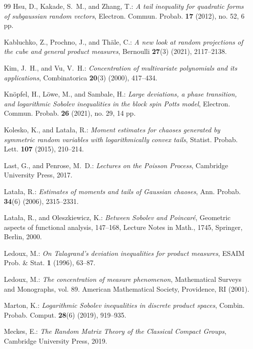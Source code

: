 \documentclass[a4paper,12pt]{amsart}
\numberwithin{equation}{section}
\theoremstyle{remark}
\begin{document}
\begin{thebibliography}{99}
	 Hsu, D., Kakade, S.\, M., and Zhang, T.: \emph{A tail inequality for quadratic forms of subgaussian random vectors}, Electron. Commun. Probab. \textbf{17} (2012), no. 52, 6 pp.
	
	 Kabluchko, Z., Prochno, J., and Th\"{a}le, C.: \emph{A new look at random projections of the cube and general product measures}, Bernoulli \textbf{27}(3) (2021), 2117--2138.
	
	 Kim, J.\, H., and Vu, V.\, H.: \emph{Concentration of multivariate polynomials and its applications}, Combinatorica \textbf{20}(3) (2000), 417--434.
	
	 Kn\"{o}pfel, H., L\"{o}we, M., and Sambale, H.: \emph{Large deviations, a phase transition, and logarithmic Sobolev inequalities in the block spin Potts model}, Electron. Commun. Probab. \textbf{26} (2021), no. 29, 14 pp.
	
	 Kolesko, K., and Lata{\l}a, R.: \emph{Moment estimates for chaoses generated by symmetric random variables with logarithmically convex tails}, Statist. Probab. Lett. \textbf{107} (2015), 210--214.
	
	 Last, G., and Penrose, M.\, D.: \emph{Lectures on the Poisson Process}, Cambridge University Press, 2017.
	
	 Lata{\l}a, R.: \emph{Estimates of moments and tails of Gaussian chaoses}, Ann. Probab. \textbf{34}(6) (2006), 2315--2331.
	
	 Lata{\l}a, R., and Oleszkiewicz, K.: \emph{Between Sobolev and Poincar\'e}, Geometric aspects of functional analysis, 147--168, Lecture Notes in Math., 1745, Springer, Berlin, 2000.
	
	 Ledoux, M.: \emph{On Talagrand's deviation inequalities for product measures}, ESAIM Prob. \& Stat. \textbf{1} (1996), 63--87.
	
	 Ledoux, M.: \emph{The concentration of measure phenomenon}, Mathematical Surveys and Monographs, vol. 89. American Mathematical Society, Providence, RI (2001).
	
	 Marton, K.: \emph{Logarithmic Sobolev inequalities in discrete product spaces}, Combin. Probab. Comput. \textbf{28}(6) (2019), 919--935.
	
	 Meckes, E.: \emph{The Random Matrix Theory of the Classical Compact Groups}, Cambridge University Press, 2019.
	

\end{thebibliography}
\end{document}
